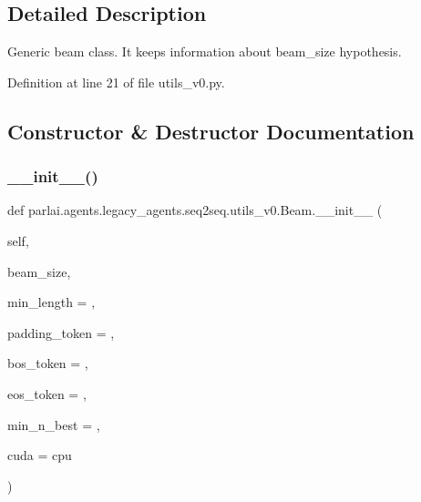 \subsection{Detailed Description}
\begin{DoxyVerb}Generic beam class. It keeps information about beam_size hypothesis.\end{DoxyVerb}
 

Definition at line 21 of file utils\+\_\+v0.\+py.



\subsection{Constructor \& Destructor Documentation}
\mbox{\label{classparlai_1_1agents_1_1legacy__agents_1_1seq2seq_1_1utils__v0_1_1Beam_a0b15ba633165fe8ae84f7664dc893b99}} 
\subsubsection{\texorpdfstring{\+\_\+\+\_\+init\+\_\+\+\_\+()}{\_\_init\_\_()}}
{\footnotesize\ttfamily def parlai.\+agents.\+legacy\+\_\+agents.\+seq2seq.\+utils\+\_\+v0.\+Beam.\+\_\+\+\_\+init\+\_\+\+\_\+ (\begin{DoxyParamCaption}\item[{}]{self,  }\item[{}]{beam\+\_\+size,  }\item[{}]{min\+\_\+length = {},  }\item[{}]{padding\+\_\+token = {},  }\item[{}]{bos\+\_\+token = {},  }\item[{}]{eos\+\_\+token = {},  }\item[{}]{min\+\_\+n\+\_\+best = {},  }\item[{}]{cuda = {\ttfamily \textquotesingle{}cpu\textquotesingle{}} }\end{DoxyParamCaption})}

